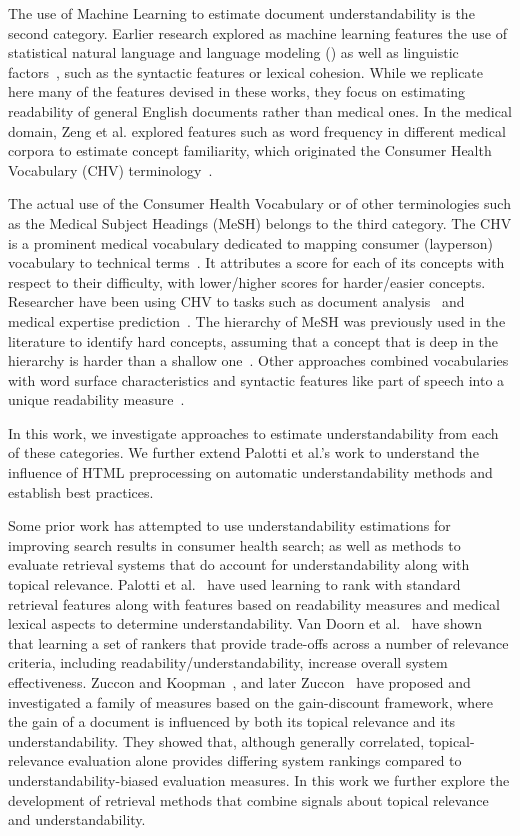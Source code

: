 The use of Machine Learning to estimate document understandability is the second category. Earlier research explored as machine learning features the use of statistical natural language and language modeling (\cite{liu04,collins05,heilman07}) as well as linguistic factors~\cite{pitler08}, such as the syntactic features or lexical cohesion. While we replicate here many of the features devised in these works, they focus on estimating readability of general English documents rather than medical ones. In the medical domain, Zeng et al. explored features such as word frequency in different medical corpora to estimate concept familiarity, which originated the Consumer Health Vocabulary (CHV) terminology~\cite{zeng05,zeng06,zeng08}.  

The actual use of the Consumer Health Vocabulary or of other terminologies such as the Medical Subject Headings (MeSH) belongs to the third category. The CHV is a prominent medical vocabulary dedicated to mapping consumer (layperson) vocabulary to technical terms~\cite{zeng06}. It attributes a score for each of its concepts with respect to their difficulty, with lower/higher scores for harder/easier concepts. Researcher have been using CHV to tasks such as document analysis~\cite{leroy08} and medical expertise prediction~\cite{palotti14}.
The hierarchy of MeSH was previously used in the literature to identify hard concepts, assuming that a concept that is deep in the hierarchy is harder than a shallow one~\cite{yan11}. Other approaches combined vocabularies with word surface characteristics and syntactic features like part of speech into a unique readability measure~\cite{kim2007beyond}.

In this work, we investigate approaches to estimate understandability from each of these categories. We further extend Palotti et al.'s work to understand the influence of HTML preprocessing on automatic understandability methods and establish best practices. 

Some prior work has attempted to use understandability estimations for improving search results in consumer health search; as well as methods to evaluate retrieval systems that do account for understandability along with topical relevance. Palotti et al.~\cite{palotti2016ranking} have used learning to rank with standard retrieval features along with features based on readability measures and medical lexical aspects to determine
understandability. Van Doorn et al.~\cite{van2016balancing} have shown that learning a set of rankers that provide trade-offs across a number of relevance criteria, including readability/understandability, increase overall system effectiveness.   
Zuccon and Koopman~\cite{zuccon14}, and later Zuccon~\cite{zuccon2016understandability} have proposed and investigated a family of measures based on the gain-discount framework, where the gain of a document is influenced by both its topical relevance and its understandability. They showed that, although generally correlated, topical-relevance evaluation alone provides differing system rankings compared to understandability-biased evaluation measures. 
In this work we further explore the development of retrieval methods that combine signals about topical relevance and understandability. 


